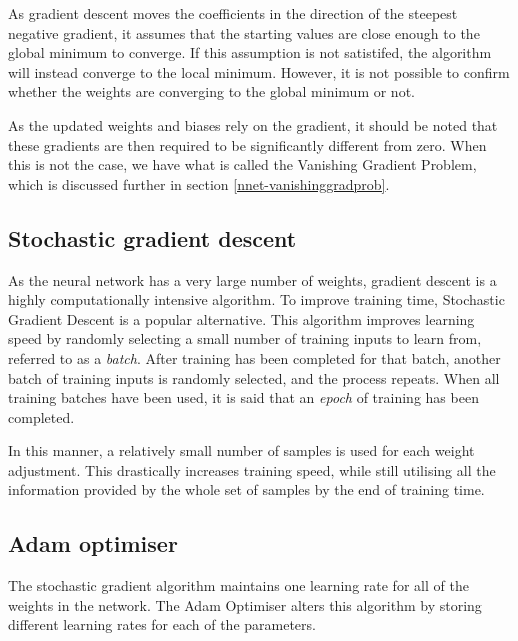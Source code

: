 As gradient descent moves the coefficients in the direction of the steepest negative gradient, it assumes that the starting values are close enough to the global minimum to converge. If this assumption is not satistifed, the algorithm will instead converge to the local minimum. However, it is not possible to confirm whether the weights are converging to the global minimum or not.

%

As the updated weights and biases rely on the gradient, it should be noted that these gradients are then required to be significantly different from zero. When this is not the case, we have what is called the Vanishing Gradient Problem, which is discussed further in section \ref{nnet-vanishinggradprob}.

\subsection*{Stochastic gradient descent}\label{nnets-stochgraddesc}

As the neural network has a very large number of weights, gradient descent is a highly computationally intensive algorithm. To improve training time, Stochastic Gradient Descent is a popular alternative. This algorithm improves learning speed by randomly selecting a small number of training inputs to learn from, referred to as a \textit{batch}. After training has been completed for that batch, another batch of training inputs is randomly selected, and the process repeats. When all training batches have been used, it is said that an \textit{epoch} of training has been completed.

In this manner, a relatively small number of samples is used for each weight adjustment. This drastically increases training speed, while still utilising all the information provided by the whole set of samples by the end of training time.

\subsection*{Adam optimiser}\label{nnets-adam}

The stochastic gradient algorithm maintains one learning rate for all of the weights in the network. The Adam Optimiser alters this algorithm by storing different learning rates for each of the parameters. 

